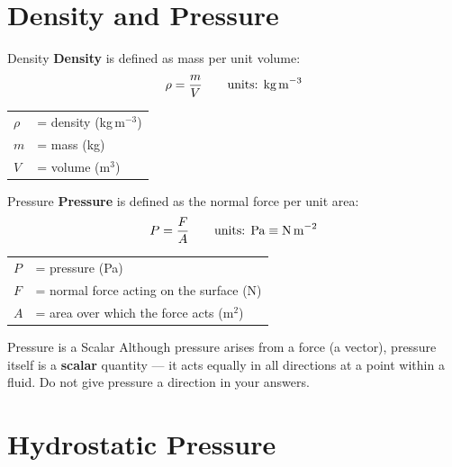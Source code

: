 \section{Density and Pressure}

\begin{definitionbox}{Density}
\textbf{Density} is defined as mass per unit volume:
$$\rho = \frac{m}{V} \qquad \text{units: kg\,m}^{-3}$$
\begin{tabular}{@{}ll@{}}
$\rho$ & = density (kg\,m$^{-3}$) \\
$m$   & = mass (kg) \\
$V$   & = volume (m$^3$) \\
\end{tabular}
\end{definitionbox}

\begin{definitionbox}{Pressure}
\textbf{Pressure} is defined as the normal force per unit area:
$$P = \frac{F}{A} \qquad \text{units: Pa} \equiv \text{N\,m}^{-2}$$
\begin{tabular}{@{}ll@{}}
$P$ & = pressure (Pa) \\
$F$ & = normal force acting on the surface (N) \\
$A$ & = area over which the force acts (m$^2$) \\
\end{tabular}
\end{definitionbox}

\begin{warningbox}{Pressure is a Scalar}
Although pressure arises from a force (a vector), pressure itself is a \textbf{scalar} quantity — it acts equally in all directions at a point within a fluid. Do not give pressure a direction in your answers.
\end{warningbox}


\pagebreak
\section{Hydrostatic Pressure}


